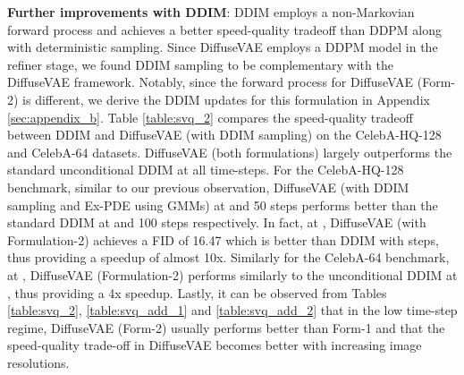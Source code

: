 \documentclass[10pt]{article} \usepackage[accepted]{tmlr}
\begin{document}
\textbf{Further improvements with DDIM}: DDIM \citep{song2021denoising} employs a non-Markovian forward process and achieves a better speed-quality tradeoff than DDPM along with deterministic sampling. Since DiffuseVAE employs a DDPM model in the refiner stage, we found DDIM sampling to be complementary with the DiffuseVAE framework. Notably, since the forward process for DiffuseVAE (Form-2) is different, we derive the DDIM updates for this formulation in Appendix \ref{sec:appendix_b}. Table \ref{table:svq_2} compares the speed-quality tradeoff between DDIM and DiffuseVAE (with DDIM sampling) on the CelebA-HQ-128 and CelebA-64 datasets. DiffuseVAE (both formulations) largely outperforms the standard unconditional DDIM at all time-steps. For the CelebA-HQ-128 benchmark, similar to our previous observation, DiffuseVAE (with DDIM sampling and Ex-PDE using GMMs) at  and 50 steps performs better than the standard DDIM at  and 100 steps respectively. In fact, at , DiffuseVAE (with Formulation-2) achieves a FID of 16.47 which is better than DDIM with  steps, thus providing a speedup of almost 10x. Similarly for the CelebA-64 benchmark, at , DiffuseVAE (Formulation-2) performs similarly to the unconditional DDIM at , thus providing a 4x speedup. Lastly, it can be observed from Tables \ref{table:svq_2}, \ref{table:svq_add_1} and \ref{table:svq_add_2} that in the low time-step regime, DiffuseVAE (Form-2) usually performs better than Form-1 and that the speed-quality trade-off in DiffuseVAE becomes better with increasing image resolutions.
\end{document}
